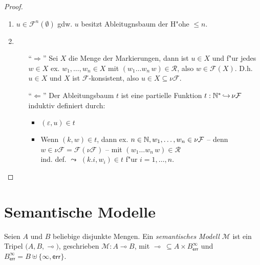 \documentclass[12pt,a4paper,final]{article}
\begin{document}
\begin{proof} \
  \begin{enumerate}
  \item $u \in \mathcal{F}^n(\emptyset)$ gdw. $u$ besitzt Ableitugnsbaum der H"ohe $\le n$.
  \item 
    \begin{itemize}
    \item[``$\Rightarrow$'']
      Sei $X$ die Menge der Markierungen, dann ist $u \in X$ und f"ur jedes $w \in X$ ex.
      $w_1,\ldots,w_n \in X$ mit $(w_1 \ldots w_n\,w) \in \mathcal{R}$, also
      $w \in \mathcal{F}(X)$. D.h. $u \in X$ und $X$ ist $\mathcal{F}$-konsistent, also
      $u \in X \subseteq \nu \mathcal{F}$.
    \item[``$\Leftarrow$'']
      Der Ableitungsbaum $t$ ist eine partielle Funktion $t: \mathbb N^* \operatorname{\hookrightarrow} \nu\mathcal{F}$ induktiv definiert
      durch:
      \begin{itemize}
      \item $(\varepsilon,u) \in t$
      \item Wenn $(k,w) \in t$, dann ex. $n\in\mathbb N,w_1,\ldots,w_n \in \nu\mathcal{F}$ --
        denn $w \in \nu\mathcal{F} = \mathcal{F}(\nu\mathcal{F})$ -- mit
        $(w_1 \ldots w_n\,w) \in \mathcal{R}$ \\
        ind. def. $\leadsto$ $(k.i,w_i) \in t$ f"ur $i=1,\ldots,n$.
      \end{itemize}
    \end{itemize}
  \end{enumerate}
\end{proof}



\section{Semantische Modelle}
\label{sec:Semantische_Modelle}

\begin{definition}
  Seien $A$ und $B$ beliebige disjunkte Mengen.
  Ein \emph{semantisches Modell} $\mathcal{M}$ ist ein Tripel $\bigl(A, B, \multimap\bigr)$,
  geschrieben $\mathcal{M}: A \multimap B$, mit \mbox{$\multimap\ \subseteq A \times B^\infty_{\textsf{err}}$}
  und $B^\infty_{\textsf{err}} = B \uplus \{\infty,\textsf{err}\}$.
\end{definition}
\end{document}

